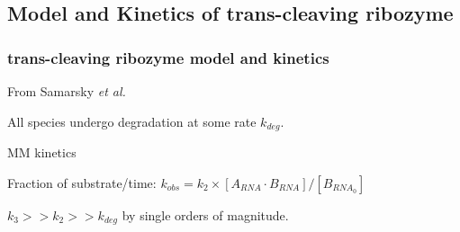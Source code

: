 \documentclass{beamer}
\begin{document}

\subsection{Model and Kinetics of trans-cleaving ribozyme}
\begin{frame}
\frametitle{trans-cleaving ribozyme model and kinetics}

From Samarsky \emph{et al.} 


\bigskip


\bigskip 

All species undergo degradation at some rate $k_{deg}$.

\bigskip

MM kinetics

Fraction of substrate/time: $k_{obs} = k_2 \times [A_{RNA}\cdot B_{RNA}]/[B_{RNA_{0}}]$

$k_3>>k_2>>k_{deg}$ by single orders of magnitude. 

\end{frame}


%

\end{document}
